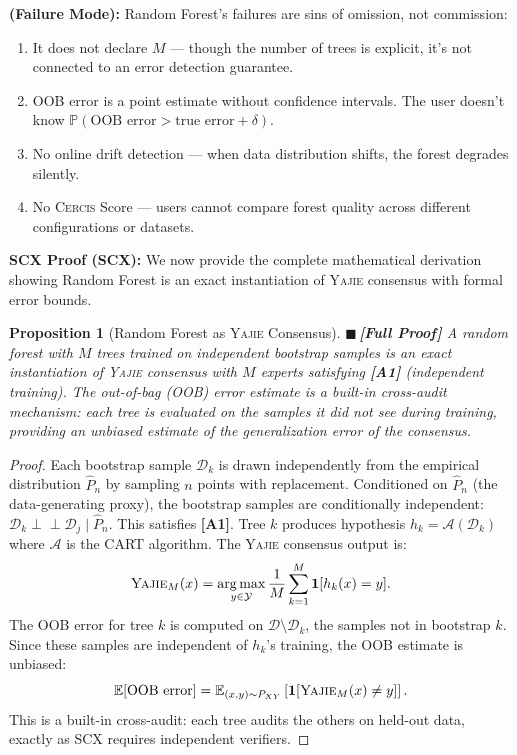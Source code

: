\documentclass[12pt,a4paper]{article}
\newtheorem{proposition}[theorem]{Proposition}
\theoremstyle{definition}
\newcommand{\rigorFull}{{\color{rigorcolor}$\blacksquare$\,\textbf{[Full Proof]}}}
\newcommand{\Yajie}{\textsc{Yajie}}
\newcommand{\Cercis}{\textsc{Cercis}}
\newcommand{\SCX}{\textsc{SCX}}
\DeclareMathOperator*{\argmax}{arg\,max}
\newcommand{\E}{\mathbb{E}}
\newcommand{\Pbb}{\mathbb{P}}
\newcommand{\cA}{\mathcal{A}}
\newcommand{\cD}{\mathcal{D}}
\newcommand{\cY}{\mathcal{Y}}
\newcommand{\ind}[1]{\mathbf{1}[#1]}
\newcommand{\asmTag}[1]{\textsf{\textbf{[A#1]}}}
\newcommand{\whyFail}{\noindent\textbf{ (Failure Mode):} }
\newcommand{\scxProof}{\noindent\textbf{SCX Proof (SCX):} }
\newcommand{\condind}{\perp\!\!\!\perp}
\begin{document}
\whyFail{} Random Forest's failures are sins of omission, not commission:
\begin{enumerate}[nosep]
    \item It does not declare $M$ — though the number of trees is explicit, it's not connected to an error detection guarantee.
    \item OOB error is a point estimate without confidence intervals. The user doesn't know $\Pbb(\text{OOB error} > \text{true error} + \delta)$.
    \item No online drift detection — when data distribution shifts, the forest degrades silently.
    \item No \Cercis{} Score — users cannot compare forest quality across different configurations or datasets.
\end{enumerate}

\scxProof{} We now provide the complete mathematical derivation showing Random Forest is an exact instantiation of \Yajie{} consensus with formal error bounds.

\begin{proposition}[Random Forest as \Yajie{} Consensus]\label{prop:rf_yajie}
\rigorFull
A random forest with $M$ trees trained on independent bootstrap samples is an exact instantiation of \Yajie{} consensus with $M$ experts satisfying \asmTag{1} (independent training). The out-of-bag (OOB) error estimate is a built-in cross-audit mechanism: each tree is evaluated on the samples it did not see during training, providing an unbiased estimate of the generalization error of the consensus.
\end{proposition}

\begin{proof}
Each bootstrap sample $\cD_k$ is drawn independently from the empirical distribution $\hat{P}_n$ by sampling $n$ points with replacement. Conditioned on $\hat{P}_n$ (the data-generating proxy), the bootstrap samples are conditionally independent: $\cD_k \condind \cD_j \mid \hat{P}_n$. This satisfies \asmTag{1}. Tree $k$ produces hypothesis $h_k = \cA(\cD_k)$ where $\cA$ is the CART algorithm. The \Yajie{} consensus output is:
\begin{equation}\label{eq:rf_consensus}
    \Yajie_M(x) = \argmax_{y \in \cY} \frac{1}{M}\sum_{k=1}^{M} \ind{h_k(x) = y}.
\end{equation}
The OOB error for tree $k$ is computed on $\cD \setminus \cD_k$, the samples not in bootstrap $k$. Since these samples are independent of $h_k$'s training, the OOB estimate is unbiased:
\begin{equation}
    \E[\text{OOB error}] = \E_{(x,y) \sim P_{XY}}\left[\ind{\Yajie_M(x) \neq y}\right].
\end{equation}
This is a built-in cross-audit: each tree audits the others on held-out data, exactly as \SCX{} requires independent verifiers.
\end{proof}
\end{document}
